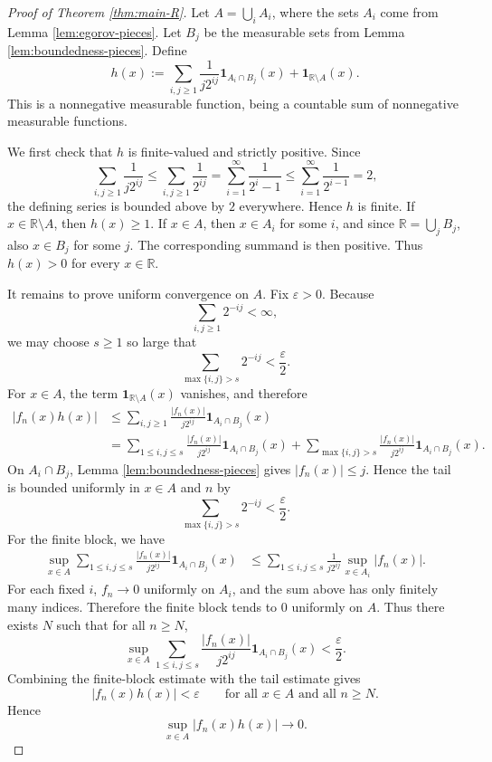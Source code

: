 \documentclass[11pt]{article}
\newcommand{\R}{\mathbb{R}}
\newcommand{\eps}{\varepsilon}
\newcommand{\one}{\mathbf 1}
\theoremstyle{plain}
\theoremstyle{definition}
\theoremstyle{remark}
\begin{document}
\begin{proof}[Proof of Theorem \ref{thm:main-R}]
Let $A=\bigcup_i A_i$, where the sets $A_i$ come from
Lemma \ref{lem:egorov-pieces}.  Let $B_j$ be the measurable sets from
Lemma \ref{lem:boundedness-pieces}.  Define
\[
        h(x)
        :=
        \sum_{i,j\geq 1}\frac{1}{j2^{ij}}\one_{A_i\cap B_j}(x)
        +\one_{\R\setminus A}(x).
\]
This is a nonnegative measurable function, being a countable sum of
nonnegative measurable functions.

We first check that $h$ is finite-valued and strictly positive.  Since
\[
        \sum_{i,j\geq 1}\frac{1}{j2^{ij}}
        \leq
        \sum_{i,j\geq 1}\frac{1}{2^{ij}}
        =
        \sum_{i=1}^\infty \frac{1}{2^i-1}
        \leq
        \sum_{i=1}^\infty \frac{1}{2^{i-1}}
        =2,
\]
the defining series is bounded above by $2$ everywhere.  Hence $h$ is finite.
If $x\in\R\setminus A$, then $h(x)\geq 1$.  If $x\in A$, then
$x\in A_i$ for some $i$, and since $\R=\bigcup_j B_j$, also $x\in B_j$ for
some $j$.  The corresponding summand is then positive.  Thus
$h(x)>0$ for every $x\in\R$.

It remains to prove uniform convergence on $A$.  Fix $\eps>0$.  Because
\[
        \sum_{i,j\geq 1}2^{-ij}<\infty,
\]
we may choose $s\geq 1$ so large that
\[
        \sum_{\max\{i,j\}>s}2^{-ij}<\frac{\eps}{2}.
\]
For $x\in A$, the term $\one_{\R\setminus A}(x)$ vanishes, and therefore
\[
\begin{aligned}
        |f_n(x)h(x)|
        &\leq
        \sum_{i,j\geq 1}
        \frac{|f_n(x)|}{j2^{ij}}\one_{A_i\cap B_j}(x) \\
        &=
        \sum_{1\leq i,j\leq s}
        \frac{|f_n(x)|}{j2^{ij}}\one_{A_i\cap B_j}(x)
        +
        \sum_{\max\{i,j\}>s}
        \frac{|f_n(x)|}{j2^{ij}}\one_{A_i\cap B_j}(x).
\end{aligned}
\]
On $A_i\cap B_j$, Lemma \ref{lem:boundedness-pieces} gives
$|f_n(x)|\leq j$.  Hence the tail is bounded uniformly in $x\in A$ and
$n$ by
\[
        \sum_{\max\{i,j\}>s}2^{-ij}<\frac{\eps}{2}.
\]
For the finite block, we have
\[
\begin{aligned}
        \sup_{x\in A}
        \sum_{1\leq i,j\leq s}
        \frac{|f_n(x)|}{j2^{ij}}\one_{A_i\cap B_j}(x)
        &\leq
        \sum_{1\leq i,j\leq s}
        \frac{1}{j2^{ij}}\sup_{x\in A_i}|f_n(x)|.
\end{aligned}
\]
For each fixed $i$, $f_n\to 0$ uniformly on $A_i$, and the sum above has only
finitely many indices.  Therefore the finite block tends to $0$ uniformly on
$A$.  Thus there exists $N$ such that for all $n\geq N$,
\[
        \sup_{x\in A}
        \sum_{1\leq i,j\leq s}
        \frac{|f_n(x)|}{j2^{ij}}\one_{A_i\cap B_j}(x)
        <\frac{\eps}{2}.
\]
Combining the finite-block estimate with the tail estimate gives
\[
        |f_n(x)h(x)|<\eps
        \qquad\text{for all }x\in A\text{ and all }n\geq N.
\]
Hence
\[
        \sup_{x\in A}|f_n(x)h(x)|\to 0.
\]


\end{proof}
\end{document}
